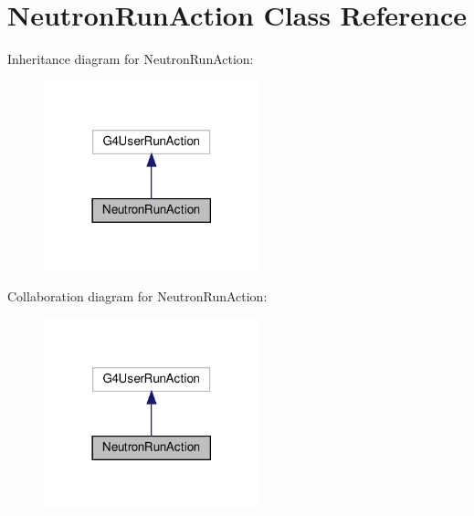 \hypertarget{classNeutronRunAction}{}\section{Neutron\+Run\+Action Class Reference}
\label{classNeutronRunAction}


Inheritance diagram for Neutron\+Run\+Action\+:
\nopagebreak
\begin{figure}[H]
\begin{center}
\leavevmode
\includegraphics[width=177pt]{classNeutronRunAction__inherit__graph}
\end{center}
\end{figure}


Collaboration diagram for Neutron\+Run\+Action\+:
\nopagebreak
\begin{figure}[H]
\begin{center}
\leavevmode
\includegraphics[width=177pt]{classNeutronRunAction__coll__graph}
\end{center}
\end{figure}
